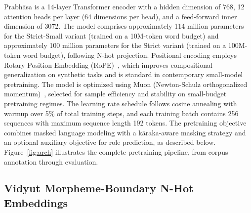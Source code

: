 
Prabhāsa is a 14-layer Transformer encoder with a hidden dimension of 768, 12 attention heads per layer (64 dimensions per head), and a feed-forward inner dimension of 3072. The model comprises approximately 114 million parameters for the Strict-Small variant (trained on a 10M-token word budget) and approximately 100 million parameters for the Strict variant (trained on a 100M-token word budget), following N-hot projection. Positional encoding employs Rotary Position Embedding (RoPE)~\cite{Su2021RoPE}, which improves compositional generalization on synthetic tasks and is standard in contemporary small-model pretraining. The model is optimized using Muon (Newton-Schulz orthogonalized momentum)~\cite{Jordan2024Muon}, selected for sample efficiency and stability on small-budget pretraining regimes. The learning rate schedule follows cosine annealing with warmup over 5\% of total training steps, and each training batch contains 256 sequences with maximum sequence length 192 tokens. The pretraining objective combines masked language modeling with a kāraka-aware masking strategy and an optional auxiliary objective for role prediction, as described below. Figure~\ref{fig:arch} illustrates the complete pretraining pipeline, from corpus annotation through evaluation.

\subsection{Vidyut Morpheme-Boundary N-Hot Embeddings}


